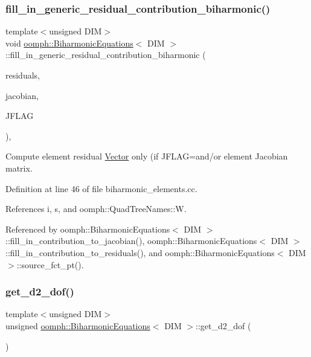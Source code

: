 \subsubsection{\texorpdfstring{fill\+\_\+in\+\_\+generic\+\_\+residual\+\_\+contribution\+\_\+biharmonic()}{fill\_in\_generic\_residual\_contribution\_biharmonic()}}
{\footnotesize\ttfamily template$<$unsigned D\+IM$>$ \\
void \hyperlink{classoomph_1_1BiharmonicEquations}{oomph\+::\+Biharmonic\+Equations}$<$ D\+IM $>$\+::fill\+\_\+in\+\_\+generic\+\_\+residual\+\_\+contribution\+\_\+biharmonic (\begin{DoxyParamCaption}\item[{\hyperlink{classoomph_1_1Vector}{Vector}$<$ double $>$ \&}]{residuals,  }\item[{\hyperlink{classoomph_1_1DenseMatrix}{Dense\+Matrix}$<$ double $>$ \&}]{jacobian,  }\item[{unsigned}]{J\+F\+L\+AG }\end{DoxyParamCaption})\hspace{0.3cm}{\ttfamily [protected]}, {\ttfamily [virtual]}}



Compute element residual \hyperlink{classoomph_1_1Vector}{Vector} only (if J\+F\+L\+AG=and/or element Jacobian matrix. 



Definition at line 46 of file biharmonic\+\_\+elements.\+cc.



References i, s, and oomph\+::\+Quad\+Tree\+Names\+::W.



Referenced by oomph\+::\+Biharmonic\+Equations$<$ D\+I\+M $>$\+::fill\+\_\+in\+\_\+contribution\+\_\+to\+\_\+jacobian(), oomph\+::\+Biharmonic\+Equations$<$ D\+I\+M $>$\+::fill\+\_\+in\+\_\+contribution\+\_\+to\+\_\+residuals(), and oomph\+::\+Biharmonic\+Equations$<$ D\+I\+M $>$\+::source\+\_\+fct\+\_\+pt().

\mbox{\label{classoomph_1_1BiharmonicEquations_ade58315d59e79499aec5b08aac9c2d16}} 
\subsubsection{\texorpdfstring{get\+\_\+d2\+\_\+dof()}{get\_d2\_dof()}}
{\footnotesize\ttfamily template$<$unsigned D\+IM$>$ \\
unsigned \hyperlink{classoomph_1_1BiharmonicEquations}{oomph\+::\+Biharmonic\+Equations}$<$ D\+IM $>$\+::get\+\_\+d2\+\_\+dof (\begin{DoxyParamCaption}{ }\end{DoxyParamCaption})\hspace{0.3cm}{\ttfamily [inline]}}



